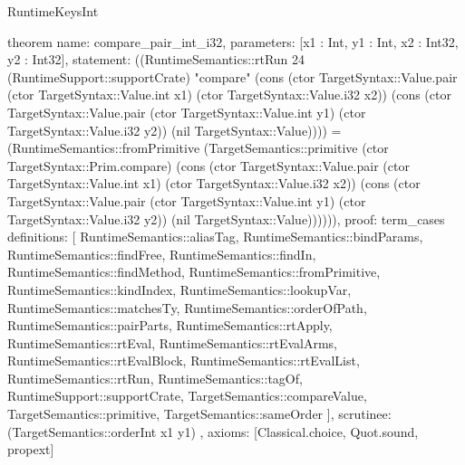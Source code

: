 \begin{lexlean}{RuntimeKeysInt}
\begin{semanticmodule}
theorem{
  name: compare_pair_int_i32,
  parameters: [x1 : Int, y1 : Int, x2 : Int32, y2 : Int32],
  statement: ((RuntimeSemantics::rtRun 24 (RuntimeSupport::supportCrate) "compare" (cons (ctor TargetSyntax::Value.pair (ctor TargetSyntax::Value.int x1) (ctor TargetSyntax::Value.i32 x2)) (cons (ctor TargetSyntax::Value.pair (ctor TargetSyntax::Value.int y1) (ctor TargetSyntax::Value.i32 y2)) (nil TargetSyntax::Value)))) = (RuntimeSemantics::fromPrimitive (TargetSemantics::primitive (ctor TargetSyntax::Prim.compare) (cons (ctor TargetSyntax::Value.pair (ctor TargetSyntax::Value.int x1) (ctor TargetSyntax::Value.i32 x2)) (cons (ctor TargetSyntax::Value.pair (ctor TargetSyntax::Value.int y1) (ctor TargetSyntax::Value.i32 y2)) (nil TargetSyntax::Value)))))),
  proof: term_cases{
    definitions: [
      RuntimeSemantics::aliasTag,
      RuntimeSemantics::bindParams,
      RuntimeSemantics::findFree,
      RuntimeSemantics::findIn,
      RuntimeSemantics::findMethod,
      RuntimeSemantics::fromPrimitive,
      RuntimeSemantics::kindIndex,
      RuntimeSemantics::lookupVar,
      RuntimeSemantics::matchesTy,
      RuntimeSemantics::orderOfPath,
      RuntimeSemantics::pairParts,
      RuntimeSemantics::rtApply,
      RuntimeSemantics::rtEval,
      RuntimeSemantics::rtEvalArms,
      RuntimeSemantics::rtEvalBlock,
      RuntimeSemantics::rtEvalList,
      RuntimeSemantics::rtRun,
      RuntimeSemantics::tagOf,
      RuntimeSupport::supportCrate,
      TargetSemantics::compareValue,
      TargetSemantics::primitive,
      TargetSemantics::sameOrder
    ],
    scrutinee: (TargetSemantics::orderInt x1 y1)
  },
  axioms: [Classical.choice, Quot.sound, propext]
}


\end{semanticmodule}
\end{lexlean}
